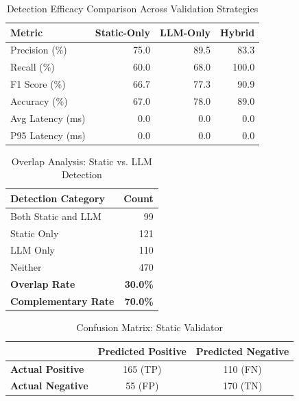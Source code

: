 

\begin{table}[h]
\centering
\caption{Detection Efficacy Comparison Across Validation Strategies}
\label{tab:detection-efficacy}
\begin{tabular}{lrrr}
\hline
\textbf{Metric} & \textbf{Static-Only} & \textbf{LLM-Only} & \textbf{Hybrid} \\
\hline
Precision (\%) & 75.0 & 89.5 & 83.3 \\
Recall (\%)    & 60.0 & 68.0 & 100.0 \\
F1 Score (\%)  & 66.7 & 77.3 & 90.9 \\
Accuracy (\%)  & 67.0 & 78.0 & 89.0 \\
\hline
Avg Latency (ms) & 0.0 & 0.0 & 0.0 \\
P95 Latency (ms) & 0.0 & 0.0 & 0.0 \\
\hline
\end{tabular}
\end{table}



\begin{table}[h]
\centering
\caption{Overlap Analysis: Static vs. LLM Detection}
\label{tab:overlap-analysis}
\begin{tabular}{lr}
\hline
\textbf{Detection Category} & \textbf{Count} \\
\hline
Both Static and LLM & 99 \\
Static Only & 121 \\
LLM Only & 110 \\
Neither & 470 \\
\hline
\textbf{Overlap Rate} & \textbf{30.0\%} \\
\textbf{Complementary Rate} & \textbf{70.0\%} \\
\hline
\end{tabular}
\end{table}



\begin{table}[h]
\centering
\caption{Confusion Matrix: Static Validator}
\label{tab:confusion-static}
\begin{tabular}{lcc}
\hline
 & \textbf{Predicted Positive} & \textbf{Predicted Negative} \\
\hline
\textbf{Actual Positive} & 165 (TP) & 110 (FN) \\
\textbf{Actual Negative} & 55 (FP) & 170 (TN) \\
\hline
\end{tabular}
\end{table}


